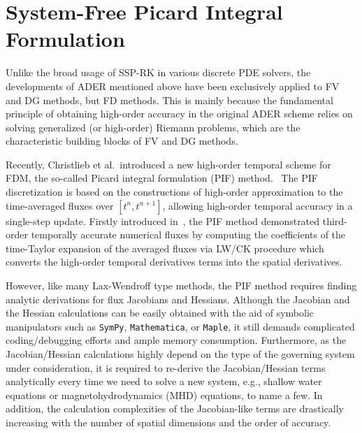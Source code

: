 \chapter{System-Free Picard Integral Formulation}\label{chap:sfpif}

Unlike the broad usage of SSP-RK in various discrete PDE solvers,
the developments of ADER mentioned above have been exclusively applied to FV and DG methods, but FD methods.
This is mainly because the fundamental principle of obtaining high-order accuracy
in the original ADER scheme relies on solving generalized (or high-order) Riemann problems,
which are the characteristic building blocks of FV and DG methods.

Recently, Christlieb et al.\ introduced a new high-order temporal scheme for FDM,
the so-called Picard integral formulation (PIF) method.~\cite{christlieb2015picard,seal2016explicit}
The PIF discretization is based on the constructions of high-order approximation
to the time-averaged fluxes over \( \left[ t^{n}, t^{n + 1} \right] \),
allowing high-order temporal accuracy in a single-step update.
Firstly introduced in~\cite{christlieb2015picard},
the PIF method demonstrated third-order temporally accurate numerical fluxes
by computing the coefficients of the time-Taylor expansion of the averaged fluxes
via LW/CK procedure which converts the high-order temporal derivatives terms into the spatial derivatives.

However, like many Lax-Wendroff type methods, the PIF method requires
finding analytic derivations for flux Jacobians and Hessians.
Although the Jacobian and the Hessian calculations can be easily obtained
with the aid of symbolic manipulators such as \texttt{SymPy}, \texttt{Mathematica}, or \texttt{Maple},
it still demands complicated coding/debugging efforts and ample memory consumption.
Furthermore, as the Jacobian/Hessian calculations highly depend on the
type of the governing system under consideration,
it is required to re-derive the Jacobian/Hessian terms analytically every time
we need to solve a new system, e.g., shallow water equations or magnetohydrodynamics (MHD) equations, to name a few.
In addition, the calculation complexities of the Jacobian-like terms are drastically increasing
with the number of spatial dimensions and the order of accuracy.




